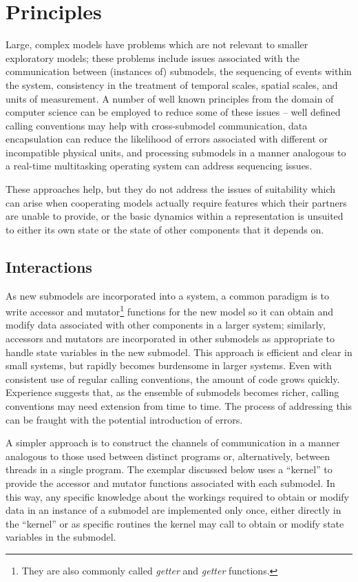 \section{Principles}
Large, complex models have problems which are not relevant to smaller
exploratory models; these problems include issues associated with the
communication between (instances of) submodels, the sequencing of
events within the system, consistency in the treatment of temporal
scales, spatial scales, and units of measurement. A number of well
known principles from the domain of computer science can be employed
to reduce some of these issues -- well defined calling conventions may
help with cross-submodel communication, data encapsulation can reduce
the likelihood of errors associated with different or incompatible
physical units, and processing submodels in a manner analogous to a
real-time multitasking operating system can address sequencing issues.

These approaches help, but they do not address the issues of
suitability which can arise when cooperating models actually require
features which their partners are unable to provide, or the basic
dynamics within a representation is unsuited to either its own state or
the state of other components that it depends on.

\subsection{Interactions}
As new submodels are incorporated into a system, a common paradigm is
to write accessor and mutator\footnote{They are also commonly called
\textit{getter} and \textit{getter} functions.} functions for the new
model so it can obtain and modify data associated with other
components in a larger system; similarly, accessors and mutators are
incorporated in other submodels as appropriate to handle state
variables in the new submodel.  This approach is efficient and clear
in small systems, but rapidly becomes burdensome in larger systems.
Even with consistent use of regular calling conventions, the amount of
code grows quickly. Experience suggests that, as the ensemble of
submodels becomes richer, calling conventions may need extension from
time to time. The process of addressing this can be fraught with the
potential introduction of errors.

A simpler approach is to construct the channels of communication in a
manner analogous to those used between distinct programs or,
alternatively, between threads in a single program.  The exemplar
discussed below uses a ``kernel'' to provide the accessor and mutator
functions associated with each submodel.  In this way, any specific
knowledge about the workings required to obtain or modify data in an
instance of a submodel are implemented only once, either directly in
the ``kernel'' or as specific routines the kernel may call to obtain
or modify state variables in the submodel.

